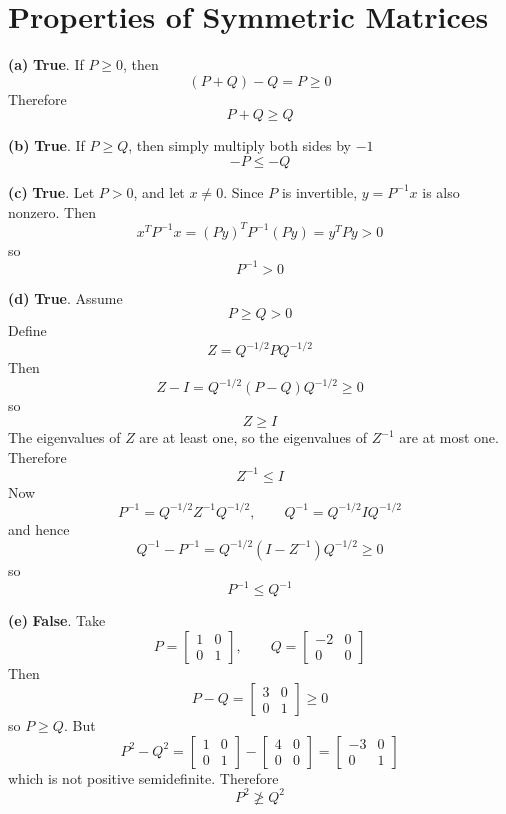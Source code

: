 \section{Properties of Symmetric Matrices}


\textbf{(a)}
\textbf{True}. If \(P\ge 0\), then
\[
(P+Q)-Q=P\ge 0
\]
Therefore
\[
P+Q\ge Q
\]

\textbf{(b)}
\textbf{True}. If \(P\ge Q\), then simply multiply both sides by $-1$
\[
-P\le -Q
\]


\textbf{(c)}
\textbf{True}. Let \(P>0\), and let \(x\ne 0\). Since \(P\) is invertible, \(y=P^{-1}x\) is also nonzero. Then
\[
x^T P^{-1}x
=
(Py)^T P^{-1}(Py)
=
y^T P y
>0
\]
so
\[
P^{-1}>0
\]








\textbf{(d)}
\textbf{True}. Assume
\[
P\ge Q>0
\]
Define
\[
Z=Q^{-1/2}P Q^{-1/2}
\]
Then
\[
Z-I=Q^{-1/2}(P-Q)Q^{-1/2}\ge 0
\]
so
\[
Z\ge I
\]
The eigenvalues of \(Z\) are at least one, so the eigenvalues of \(Z^{-1}\) are at most one. Therefore
\[
Z^{-1}\le I
\]
Now
\[
P^{-1}=Q^{-1/2}Z^{-1}Q^{-1/2},
\qquad
Q^{-1}=Q^{-1/2}IQ^{-1/2}
\]
and hence
\[
Q^{-1}-P^{-1}
=
Q^{-1/2}(I-Z^{-1})Q^{-1/2}\ge 0
\]
so
\[
P^{-1}\le Q^{-1}
\]

\textbf{(e)}
\textbf{False}. Take
\[
P=
\begin{bmatrix}
1&0\\
0&1
\end{bmatrix},
\qquad
Q=
\begin{bmatrix}
-2&0\\
0&0
\end{bmatrix}
\]
Then
\[
P-Q=
\begin{bmatrix}
3&0\\
0&1
\end{bmatrix}\ge 0
\]
so \(P\ge Q\). But
\[
P^2-Q^2
=
\begin{bmatrix}
1&0\\
0&1
\end{bmatrix}
-
\begin{bmatrix}
4&0\\
0&0
\end{bmatrix}
=
\begin{bmatrix}
-3&0\\
0&1
\end{bmatrix}
\]
which is not positive semidefinite. Therefore
\[
P^2\not\ge Q^2
\]
